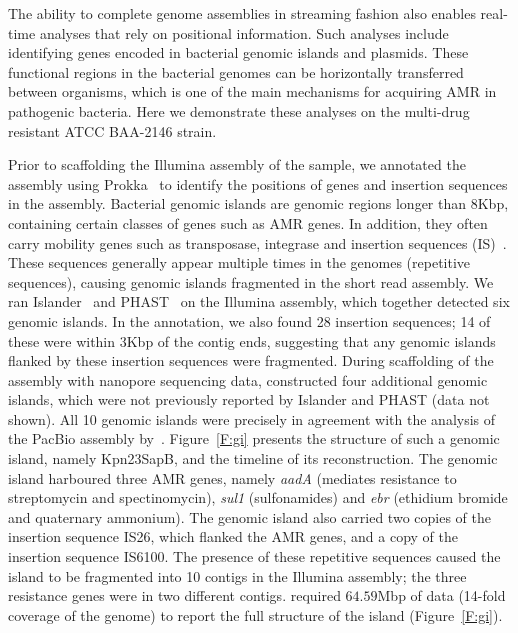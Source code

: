 The ability to complete genome assemblies in streaming fashion also enables
real-time analyses that rely on positional information. Such analyses include
identifying genes encoded in bacterial genomic islands and plasmids. These
functional regions in the bacterial genomes can be horizontally transferred
between organisms, which is one of the main mechanisms for acquiring AMR in
pathogenic bacteria. Here we demonstrate these analyses on the multi-drug
resistant \kp{} ATCC BAA-2146 strain.

Prior to scaffolding the Illumina assembly of the sample, we annotated the
assembly using Prokka~\cite{Seemann2014} to identify the positions of genes and
insertion sequences in the assembly. Bacterial genomic islands are genomic
regions longer than $8$Kbp, containing certain classes of genes such as AMR genes.
In addition, they often carry mobility genes such as transposase, integrase and
insertion sequences (IS)~\cite{LangilleHB2010}. These sequences generally
appear multiple times in the genomes (repetitive sequences), causing genomic
islands fragmented in the short read assembly. We ran Islander~\cite{MantriW2004}
and PHAST~\cite{ZhouLL2011} on the Illumina assembly, which together detected
six genomic islands. In the annotation, we also found 28 insertion sequences; 14
of these were within $3$Kbp of the contig ends, suggesting that any genomic
islands flanked by these insertion sequences were fragmented. During scaffolding
of the assembly with nanopore sequencing data, \npscarf{} constructed four
additional genomic islands, which were not previously reported by Islander and
PHAST (data not shown). All 10 genomic islands were precisely in agreement with 
the analysis of the PacBio assembly by~\cite{HudsonBM2014}. Figure~\ref{F:gi}
presents the structure of such a genomic island, namely Kpn23SapB, and the
timeline of its reconstruction. The genomic island harboured three AMR genes, 
namely \emph{aadA} (mediates resistance to streptomycin and spectinomycin), 
\emph{sul1} (sulfonamides) and \emph{ebr} (ethidium bromide and quaternary
ammonium). The genomic island also carried two copies of the insertion sequence 
IS26, which flanked the AMR genes, and a copy of the insertion sequence IS6100.
The presence of these repetitive sequences caused the island to be fragmented 
into 10 contigs in the Illumina assembly; the three resistance genes were in two
different contigs. \npscarf{} required $64.59$Mbp of data (14-fold coverage of the 
genome) to report the full structure of the island (Figure~\ref{F:gi}).



